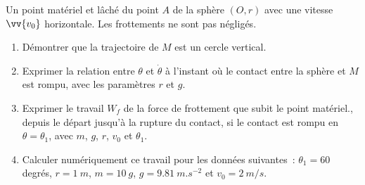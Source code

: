 %
\begin{exercice}
  Un point matériel et lâché du point $A$ de la sphère $(O, r)$ avec une vitesse $\vv{v_0}$ horizontale. Les frottements ne sont pas négligés.
  \begin{enumerate}
  \item Démontrer que la trajectoire de $M$ est un cercle vertical.
  \item Exprimer la relation entre $\theta$ et $\dot{\theta}$ à l'instant où le contact entre la sphère et $M$ est rompu, avec les paramètres $r$ et $g$.
  \item Exprimer le travail $W_f$ de la force de frottement que subit le point matériel., depuis le départ jusqu'à la rupture du contact, si le contact est rompu en $\theta=\theta_1$, avec $m$, $g$, $r$, $v_0$ et $\theta_1$.
  \item Calculer numériquement ce travail pour les données suivantes~: $\theta_1=60$ degrés, $r=\SI{1}{m}$, $m=\SI{10}{g}$, $g=\SI{9,81}{m.s^{-2}}$ et $v_0=\SI{2}{m/s}$.
  \end{enumerate}

\end{exercice}
